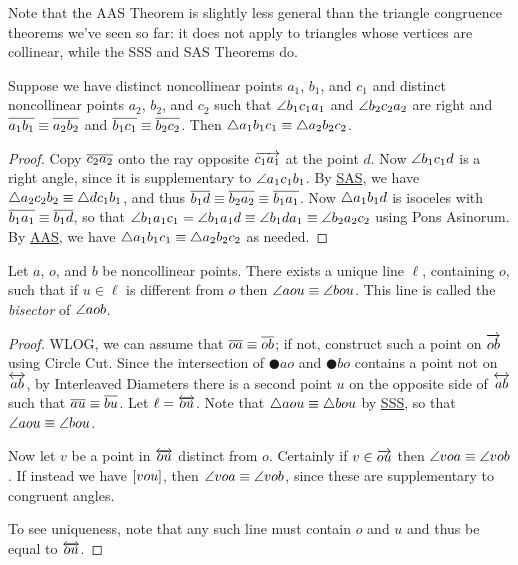 Note that the AAS Theorem is slightly less general than the triangle congruence theorems we've seen so far: it does not apply to triangles whose vertices are collinear, while the SSS and SAS Theorems do.

\begin{prop}[HL Theorem]
Suppose we have distinct noncollinear points \(a_1\), \(b_1\), and \(c_1\) and distinct noncollinear points \(a_2\), \(b_2\), and \(c_2\) such that \(\angle{b_1c_1a_1}\) and \(\angle{b_2c_2a_2}\) are right and \(\overline{a_1b_1} \equiv \overline{a_2b_2}\) and \(\overline{b_1c_1} \equiv \overline{b_2c_2}\).
Then \(\bigtriangleup{a_1b_1c_1} \equiv \bigtriangleup{a_2b_2c_2}\).
\end{prop}

\begin{proof}
Copy \(\overline{c_2a_2}\) onto the ray opposite \(\overrightarrow{c_1a_1}\) at the point \(d\).
Now \(\angle{b_1c_1d}\) is a right angle, since it is supplementary to \(\angle{a_1c_1b_1}\).
By \hyperref[prop:sas-theorem]{SAS}, we have \(\bigtriangleup{a_2c_2b_2} \equiv \bigtriangleup{dc_1b_1}\), and thus \(\overline{b_1d} \equiv \overline{b_2a_2} \equiv \overline{b_1a_1}\).
Now \(\bigtriangleup{a_1b_1d}\) is isoceles with \(\overline{b_1a_1} \equiv \overline{b_1d}\), so that \(\angle{b_1a_1c_1} = \angle{b_1a_1d} \equiv \angle{b_1da_1} \equiv \angle{b_2a_2c_2}\) using Pons Asinorum.
By \hyperref[prop:aas-theorem]{AAS}, we have \(\bigtriangleup{a_1b_1c_1} \equiv \bigtriangleup{a_2b_2c_2}\) as needed.
\end{proof}


\begin{construct}
Let \(a\), \(o\), and \(b\) be noncollinear points.
There exists a unique line \(\ell\), containing \(o\), such that if \(u \in \ell\) is different from \(o\) then \(\angle{aou} \equiv \angle{bou}\).
This line is called the \emph{bisector} of \(\angle{aob}\).
\end{construct}

\begin{proof}
WLOG, we can assume that \(\overline{oa} \equiv \overline{ob}\); if not, construct such a point on \(\overrightarrow{ob}\) using Circle Cut.
Since the intersection of \(\CIRCLE{a}{o}\) and \(\CIRCLE{b}{o}\) contains a point not on \(\overleftrightarrow{ab}\), by Interleaved Diameters there is a second point \(u\) on the opposite side of \(\overleftrightarrow{ab}\) such that \(\overline{au} \equiv \overline{bu}\).
Let \(\ell = \overleftrightarrow{ou}\).
Note that \(\bigtriangleup{aou} \equiv \bigtriangleup{bou}\) by \hyperref[prop:sss-theorem]{SSS}, so that \(\angle{aou} \equiv \angle{bou}\).

Now let \(v\) be a point in \(\overleftrightarrow{ou}\) distinct from \(o\).
Certainly if \(v \in \overrightarrow{ou}\) then \(\angle{voa} \equiv \angle{vob}\).
If instead we have \([ v o u ]\), then \(\angle{voa} \equiv \angle{vob}\), since these are supplementary to congruent angles.

To see uniqueness, note that any such line must contain \(o\) and \(u\) and thus be equal to \(\overleftrightarrow{ou}\).
\end{proof}

